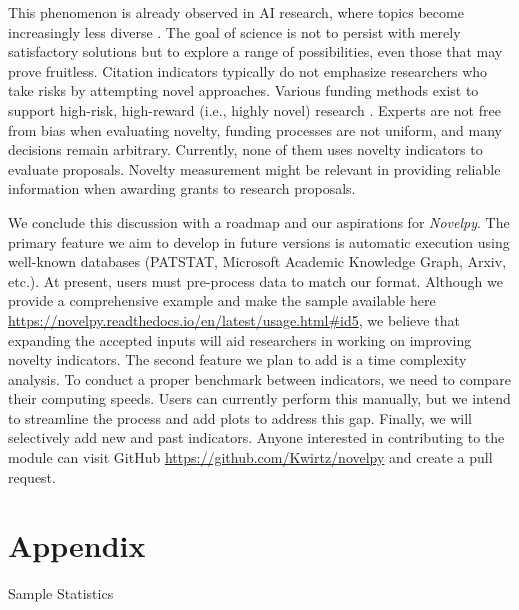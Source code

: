 This phenomenon is already observed in AI research, where topics become increasingly less diverse \citep{klinger2020narrowing}. The goal of science is not to persist with merely satisfactory solutions but to explore a range of possibilities, even those that may prove fruitless. Citation indicators typically do not emphasize researchers who take risks by attempting novel approaches. Various funding methods exist to support high-risk, high-reward (i.e., highly novel) research \citep{ocde}. Experts are not free from bias when evaluating novelty, funding processes are not uniform, and many decisions remain arbitrary. Currently, none of them uses novelty indicators to evaluate proposals. Novelty measurement might be relevant in providing reliable information when awarding grants to research proposals.

We conclude this discussion with a roadmap and our aspirations for \textit{Novelpy}. The primary feature we aim to develop in future versions is automatic execution using well-known databases (PATSTAT, Microsoft Academic Knowledge Graph, Arxiv, etc.). At present, users must pre-process data to match our format. Although we provide a comprehensive example and make the sample available here \url{https://novelpy.readthedocs.io/en/latest/usage.html\#id5}, we believe that expanding the accepted inputs will aid researchers in working on improving novelty indicators. The second feature we plan to add is a time complexity analysis. To conduct a proper benchmark between indicators, we need to compare their computing speeds. Users can currently perform this manually, but we intend to streamline the process and add plots to address this gap. Finally, we will selectively add new and past indicators. Anyone interested in contributing to the module can visit GitHub \url{https://github.com/Kwirtz/novelpy} and create a pull request.

\newpage

\section{Appendix}


\begin{table}[H]
\let\center\empty
\let\endcenter\relax
\centering
\resizebox{\columnwidth}{!}{}
\caption{Sample Statistics}
\label{tab:table2}
\end{table}

